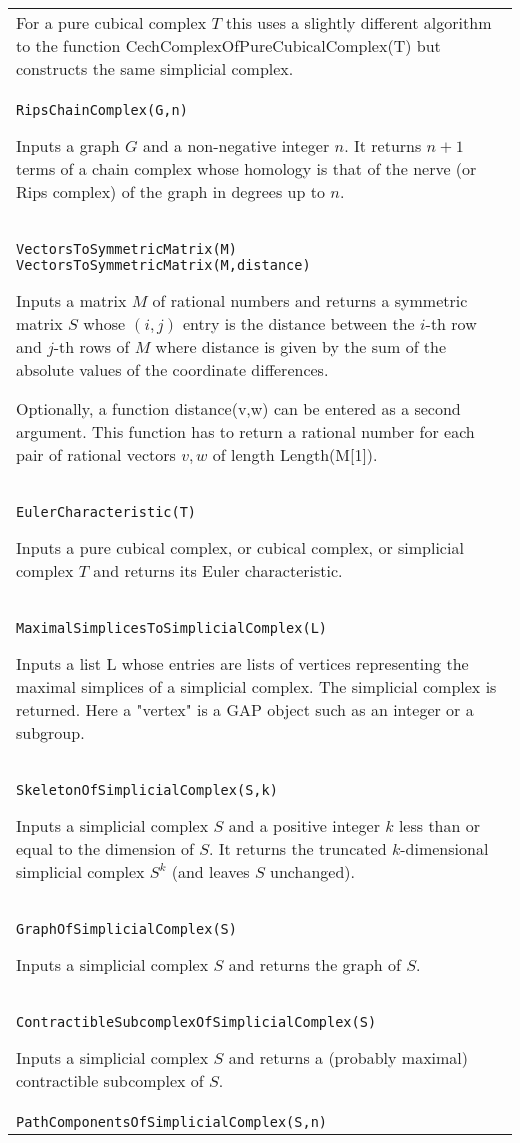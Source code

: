 \documentclass[a4paper,11pt]{report}
\begin{document}
{\begin{center}
\begin{tabular}{|l|}
 For a pure cubical complex $T$ this uses a slightly different algorithm to the function
CechComplexOfPureCubicalComplex(T) but constructs the same simplicial complex. \\
 \index{RipsChainComplex} \texttt{RipsChainComplex(G,n)} 

 Inputs a graph $G$ and a non-negative integer $n$. It returns $n+1$ terms of a chain complex whose homology is that of the nerve (or Rips complex)
of the graph in degrees up to $n$. \\
 \index{VectorsToSymmetricMatrix} \texttt{VectorsToSymmetricMatrix(M)} \texttt{VectorsToSymmetricMatrix(M,distance)} 

 Inputs a matrix $M$ of rational numbers and returns a symmetric matrix $S$ whose $(i,j)$ entry is the distance between the $i$-th row and $j$-th rows of $M$ where distance is given by the sum of the absolute values of the coordinate
differences. 

 Optionally, a function distance(v,w) can be entered as a second argument. This
function has to return a rational number for each pair of rational vectors $v,w$ of length Length(M[1]). \\
 \index{EulerCharacteristic} \texttt{EulerCharacteristic(T)} 

 Inputs a pure cubical complex, or cubical complex, or simplicial complex $T$ and returns its Euler characteristic. \\
 \index{MaximalSimplicesToSimplicialComplex} \texttt{MaximalSimplicesToSimplicialComplex(L)} 

 Inputs a list L whose entries are lists of vertices representing the maximal
simplices of a simplicial complex. The simplicial complex is returned. Here a
"vertex" is a GAP object such as an integer or a subgroup. \\
 \index{SkeletonOfSimplicialComplex} \texttt{SkeletonOfSimplicialComplex(S,k)} 

 Inputs a simplicial complex $S$ and a positive integer $k$ less than or equal to the dimension of $S$. It returns the truncated $k$-dimensional simplicial complex $S^k$ (and leaves $S$ unchanged). \\
 \index{GraphOfSimplicialComplex} \texttt{GraphOfSimplicialComplex(S)} 

 Inputs a simplicial complex $S$ and returns the graph of $S$. \\
 \index{ContractibleSubcomplexOfSimplicialComplex} \texttt{ContractibleSubcomplexOfSimplicialComplex(S)} 

 Inputs a simplicial complex $S$ and returns a (probably maximal) contractible subcomplex of $S$. \\
 \index{PathComponentsOfSimplicialComplex} \texttt{PathComponentsOfSimplicialComplex(S,n)} 


\end{tabular}
\end{center}}
\end{document}
